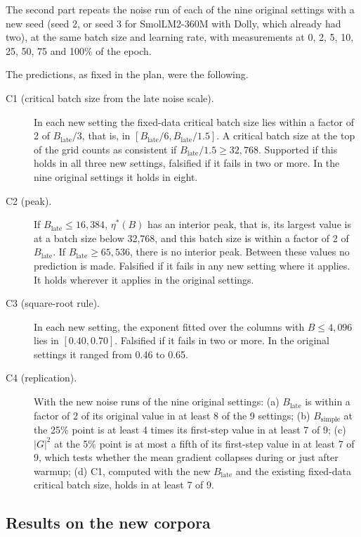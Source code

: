\documentclass[10pt]{article}
\newcommand{\bsimple}{B_{\mathrm{simple}}}
\newcommand{\blate}{B_{\mathrm{late}}}
\begin{document}
The second part repeats the noise run of each of the nine original settings with a new seed (seed 2, or seed 3 for SmolLM2-360M with Dolly, which already had two), at the same batch size and learning rate, with measurements at 0, 2, 5, 10, 25, 50, 75 and 100\% of the epoch.

The predictions, as fixed in the plan, were the following.
\begin{description}
\item[C1 (critical batch size from the late noise scale).] In each new setting the fixed-data critical batch size lies within a factor of 2 of $\blate/3$, that is, in $[\blate/6, \blate/1.5]$. A critical batch size at the top of the grid counts as consistent if $\blate/1.5 \ge 32{,}768$. Supported if this holds in all three new settings, falsified if it fails in two or more. In the nine original settings it holds in eight.
\item[C2 (peak).] If $\blate \le 16{,}384$, $\eta^*(B)$ has an interior peak, that is, its largest value is at a batch size below 32,768, and this batch size is within a factor of 2 of $\blate$. If $\blate \ge 65{,}536$, there is no interior peak. Between these values no prediction is made. Falsified if it fails in any new setting where it applies. It holds wherever it applies in the original settings.
\item[C3 (square-root rule).] In each new setting, the exponent fitted over the columns with $B \le 4{,}096$ lies in $[0.40, 0.70]$. Falsified if it fails in two or more. In the original settings it ranged from 0.46 to 0.65.
\item[C4 (replication).] With the new noise runs of the nine original settings: (a) $\blate$ is within a factor of 2 of its original value in at least 8 of the 9 settings; (b) $\bsimple$ at the 25\% point is at least 4 times its first-step value in at least 7 of 9; (c) $|G|^2$ at the 5\% point is at most a fifth of its first-step value in at least 7 of 9, which tests whether the mean gradient collapses during or just after warmup; (d) C1, computed with the new $\blate$ and the existing fixed-data critical batch size, holds in at least 7 of 9.
\end{description}

\subsection{Results on the new corpora}
\end{document}
